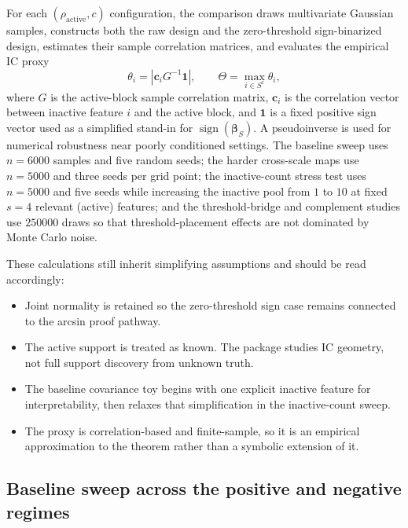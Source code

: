 For each $(\rho_{\text{active}}, c)$ configuration, the comparison draws multivariate Gaussian samples, constructs both the raw design and the zero-threshold sign-binarized design, estimates their sample correlation matrices, and evaluates the empirical IC proxy
\begin{equation}\label{eq:rq2-boundary-ic-proxy}
\theta_i = \left| \mathbf{c}_i G^{-1}\mathbf{1}\right|,
\qquad
\Theta = \max_{i\in S^c}\theta_i,
\end{equation}
where $G$ is the active-block sample correlation matrix, $\mathbf{c}_i$ is the correlation vector between inactive feature $i$ and the active block, and $\mathbf{1}$ is a fixed positive sign vector used as a simplified stand-in for $\operatorname{sign}(\boldsymbol{\beta}_S)$. A pseudoinverse is used for numerical robustness near poorly conditioned settings. The baseline sweep uses $n=6000$ samples and five random seeds; the harder cross-scale maps use $n=5000$ and three seeds per grid point; the inactive-count stress test uses $n=5000$ and five seeds while increasing the inactive pool from $1$ to $10$ at fixed $s=4$ relevant (active) features; and the threshold-bridge and complement studies use $250000$ draws so that threshold-placement effects are not dominated by Monte Carlo noise.

These calculations still inherit simplifying assumptions and should be read accordingly:
\begin{itemize}
    \item Joint normality is retained so the zero-threshold sign case remains connected to the arcsin proof pathway.
    \item The active support is treated as known. The package studies IC geometry, not full support discovery from unknown truth.
    \item The baseline covariance toy begins with one explicit inactive feature for interpretability, then relaxes that simplification in the inactive-count sweep.
    \item The proxy is correlation-based and finite-sample, so it is an empirical approximation to the theorem rather than a symbolic extension of it.
\end{itemize}

\subsection{Baseline sweep across the positive and negative regimes}


